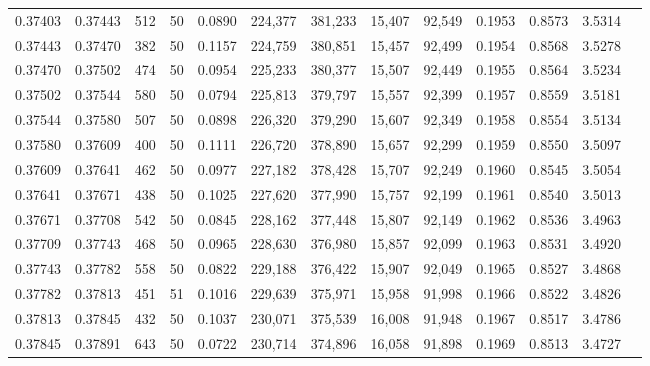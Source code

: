 \begin{tabular}{rrrrrrrrrrrrr}
0.37403 & 0.37443 &   512 &  50 &                                     0.0890 & 224,377 & 381,233 &  15,407 &  92,549 & 0.1953 & 0.8573 & 3.5314 \\
0.37443 & 0.37470 &   382 &  50 &                                     0.1157 & 224,759 & 380,851 &  15,457 &  92,499 & 0.1954 & 0.8568 & 3.5278 \\
0.37470 & 0.37502 &   474 &  50 &                                     0.0954 & 225,233 & 380,377 &  15,507 &  92,449 & 0.1955 & 0.8564 & 3.5234 \\
0.37502 & 0.37544 &   580 &  50 &                                     0.0794 & 225,813 & 379,797 &  15,557 &  92,399 & 0.1957 & 0.8559 & 3.5181 \\
0.37544 & 0.37580 &   507 &  50 &                                     0.0898 & 226,320 & 379,290 &  15,607 &  92,349 & 0.1958 & 0.8554 & 3.5134 \\
0.37580 & 0.37609 &   400 &  50 &                                     0.1111 & 226,720 & 378,890 &  15,657 &  92,299 & 0.1959 & 0.8550 & 3.5097 \\
0.37609 & 0.37641 &   462 &  50 &                                     0.0977 & 227,182 & 378,428 &  15,707 &  92,249 & 0.1960 & 0.8545 & 3.5054 \\
0.37641 & 0.37671 &   438 &  50 &                                     0.1025 & 227,620 & 377,990 &  15,757 &  92,199 & 0.1961 & 0.8540 & 3.5013 \\
0.37671 & 0.37708 &   542 &  50 &                                     0.0845 & 228,162 & 377,448 &  15,807 &  92,149 & 0.1962 & 0.8536 & 3.4963 \\
0.37709 & 0.37743 &   468 &  50 &                                     0.0965 & 228,630 & 376,980 &  15,857 &  92,099 & 0.1963 & 0.8531 & 3.4920 \\
0.37743 & 0.37782 &   558 &  50 &                                     0.0822 & 229,188 & 376,422 &  15,907 &  92,049 & 0.1965 & 0.8527 & 3.4868 \\
0.37782 & 0.37813 &   451 &  51 &                                     0.1016 & 229,639 & 375,971 &  15,958 &  91,998 & 0.1966 & 0.8522 & 3.4826 \\
0.37813 & 0.37845 &   432 &  50 &                                     0.1037 & 230,071 & 375,539 &  16,008 &  91,948 & 0.1967 & 0.8517 & 3.4786 \\
0.37845 & 0.37891 &   643 &  50 &                                     0.0722 & 230,714 & 374,896 &  16,058 &  91,898 & 0.1969 & 0.8513 & 3.4727 \\

\end{tabular}

